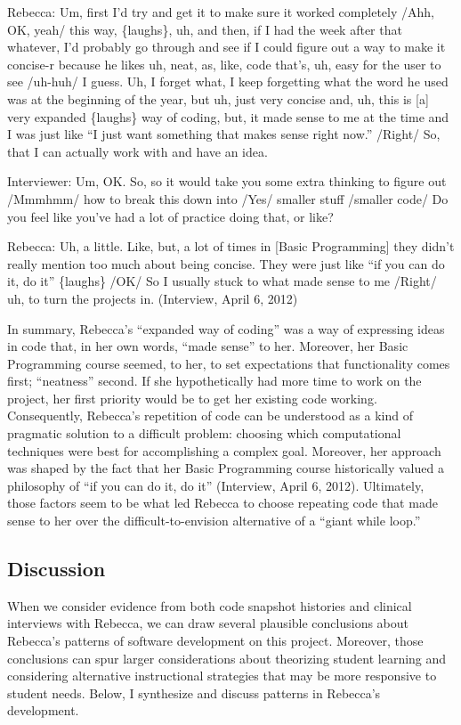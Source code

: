 Rebecca: Um, first I'd try and get it to make sure it worked completely
/Ahh, OK, yeah/ this way, \{laughs\}, uh, and then, if I had the week
after that whatever, I'd probably go through and see if I could figure
out a way to make it concise-r because he likes uh, neat, as, like, code
that's, uh, easy for the user to see /uh-huh/ I guess. Uh, I forget
what, I keep forgetting what the word he used was at the beginning of
the year, but uh, just very concise and, uh, this is {[}a{]} very
expanded \{laughs\} way of coding, but, it made sense to me at the time
and I was just like ``I just want something that makes sense right
now.'' /Right/ So, that I can actually work with and have an idea.

Interviewer: Um, OK. So, so it would take you some extra thinking to
figure out /Mmmhmm/ how to break this down into /Yes/ smaller stuff
/smaller code/ Do you feel like you've had a lot of practice doing that,
or like?

Rebecca: Uh, a little. Like, but, a lot of times in {[}Basic
Programming{]} they didn't really mention too much about being concise.
They were just like ``if you can do it, do it'' \{laughs\} /OK/ So I
usually stuck to what made sense to me /Right/ uh, to turn the projects
in. (Interview, April 6, 2012)

In summary, Rebecca's ``expanded way of coding'' was a way of expressing
ideas in code that, in her own words, ``made sense'' to her. Moreover,
her Basic Programming course seemed, to her, to set expectations that
functionality comes first; ``neatness'' second. If she hypothetically
had more time to work on the project, her first priority would be to get
her existing code working. Consequently, Rebecca's repetition of code
can be understood as a kind of pragmatic solution to a difficult
problem: choosing which computational techniques were best for
accomplishing a complex goal. Moreover, her approach was shaped by the
fact that her Basic Programming course historically valued a philosophy
of ``if you can do it, do it'' (Interview, April 6, 2012). Ultimately,
those factors seem to be what led Rebecca to choose repeating code that
made sense to her over the difficult-to-envision alternative of a
``giant while loop.''

\subsection{Discussion}\label{discussion}

When we consider evidence from both code snapshot histories and clinical
interviews with Rebecca, we can draw several plausible conclusions about
Rebecca's patterns of software development on this project. Moreover,
those conclusions can spur larger considerations about theorizing
student learning and considering alternative instructional strategies
that may be more responsive to student needs. Below, I synthesize and
discuss patterns in Rebecca's development.

